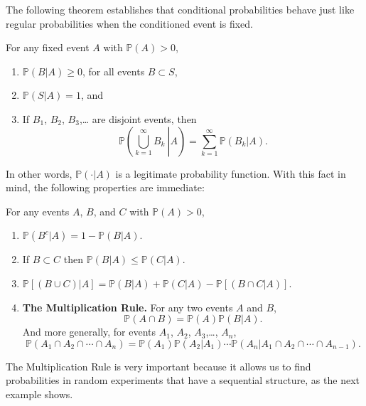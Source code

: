 \documentclass[captions=tableheading]{scrbook}
\begin{document}
The following theorem establishes that conditional probabilities behave just like regular probabilities when the conditioned event is fixed. 

\begin{thm}
For any fixed event \(A\) with \(\mathbb{P}(A)>0\),
\begin{enumerate}
\item \( \mathbb{P} (B|A)\geq 0 \), for all events \( B \subset S\),
\item \( \mathbb{P} (S|A) = 1 \), and
\item If \(B_{1}\), \(B_{2}\), \(B_{3}\),\ldots{} are disjoint events, then
  \begin{equation}
  \mathbb{P}\left(\left.\bigcup_{k=1}^{\infty}B_{k}\:\right|A\right)=\sum_{k=1}^{\infty}\mathbb{P}(B_{k}|A).
  \end{equation}
\end{enumerate}

\end{thm}
In other words, \(\mathbb{P}(\cdot|A)\) is a legitimate probability function. With this fact in mind, the following properties are immediate:

\begin{prop}
For any events \(A\), \(B\), and \(C\) with \(\mathbb{P}(A)>0\),
\begin{enumerate}
\item \( \mathbb{P} ( B^{c} | A ) = 1 - \mathbb{P} (B|A).\)
\item If \(B\subset C\) then \(\mathbb{P}(B|A)\leq\mathbb{P}(C|A)\).
\item \( \mathbb{P} [ ( B\cup C ) | A ] = \mathbb{P} (B|A) + \mathbb{P}(C|A) - \mathbb{P} [ (B \cap C|A) ].\)
\item \textbf{The Multiplication Rule.} For any two events \(A\) and \(B\),
  \begin{equation}
  \mathbb{P}(A\cap B)=\mathbb{P}(A)\mathbb{P}(B|A).\label{eq-multiplication-rule-short}
  \end{equation}
  And more generally, for events \(A_{1}\), \(A_{2}\), \(A_{3}\),\ldots{}, \(A_{n}\),
  \begin{equation}
  \mathbb{P}(A_{1}\cap A_{2}\cap\cdots\cap A_{n})=\mathbb{P}(A_{1})\mathbb{P}(A_{2}|A_{1})\cdots\mathbb{P}(A_{n}|A_{1}\cap A_{2}\cap\cdots\cap A_{n-1}).\label{eq-multiplication-rule-long}
  \end{equation}
\end{enumerate}

\end{prop}
The Multiplication Rule is very important because it allows us to find probabilities in random experiments that have a sequential structure, as the next example shows. 
\end{document}
